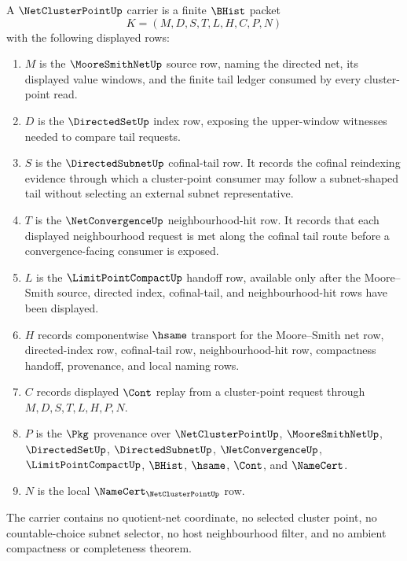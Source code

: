 \begin{definition}\label{def:net-cluster-point-carrier}
A $\NetClusterPointUp$ carrier is a finite $\BHist$ packet
$$
K=(M,D,S,T,L,H,C,P,N)
$$
with the following displayed rows:
\begin{enumerate}
\item $M$ is the $\MooreSmithNetUp$ source row, naming the directed net, its displayed value windows, and the finite tail ledger consumed by every cluster-point read.
\item $D$ is the $\DirectedSetUp$ index row, exposing the upper-window witnesses needed to compare tail requests.
\item $S$ is the $\DirectedSubnetUp$ cofinal-tail row. It records the cofinal reindexing evidence through which a cluster-point consumer may follow a subnet-shaped tail without selecting an external subnet representative.
\item $T$ is the $\NetConvergenceUp$ neighbourhood-hit row. It records that each displayed neighbourhood request is met along the cofinal tail route before a convergence-facing consumer is exposed.
\item $L$ is the $\LimitPointCompactUp$ handoff row, available only after the Moore--Smith source, directed index, cofinal-tail, and neighbourhood-hit rows have been displayed.
\item $H$ records componentwise $\hsame$ transport for the Moore--Smith net row, directed-index row, cofinal-tail row, neighbourhood-hit row, compactness handoff, provenance, and local naming rows.
\item $C$ records displayed $\Cont$ replay from a cluster-point request through $M,D,S,T,L,H,P,N$.
\item $P$ is the $\Pkg$ provenance over $\NetClusterPointUp$, $\MooreSmithNetUp$, $\DirectedSetUp$, $\DirectedSubnetUp$, $\NetConvergenceUp$, $\LimitPointCompactUp$, $\BHist$, $\hsame$, $\Cont$, and $\NameCert$.
\item $N$ is the local $\NameCert_{\NetClusterPointUp}$ row.
\end{enumerate}
The carrier contains no quotient-net coordinate, no selected cluster point, no countable-choice subnet selector, no host neighbourhood filter, and no ambient compactness or completeness theorem.
\end{definition}

